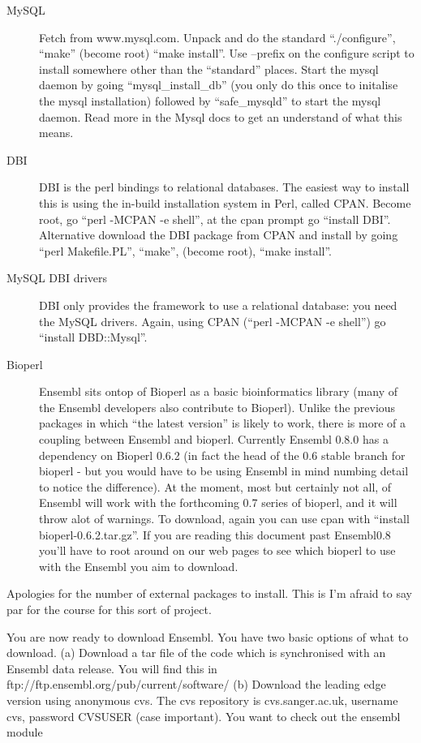 \documentclass[11pt,a4paper]{article}
\begin{document}
\begin{description}
\item[MySQL] Fetch from www.mysql.com. Unpack and do the standard ``./configure'',
``make'' (become root) ``make install''. Use --prefix on the configure script
to install somewhere other than the ``standard'' places. Start the mysql daemon by
going ``mysql\_install\_db'' (you only do this once to initalise the mysql installation) followed
by ``safe\_mysqld'' to start the mysql daemon. Read more in the Mysql docs to get an
understand of what this means.
\item[DBI] DBI is the perl bindings to relational databases. The easiest way to install
this is using the in-build installation system in Perl, called
CPAN. Become root, go ``perl -MCPAN -e shell'', at the cpan prompt go ``install DBI''.
Alternative download the DBI package from CPAN and install by going ``perl Makefile.PL'',
``make'', (become root), ``make install''.
\item[MySQL DBI drivers] DBI only provides the framework to use a relational database:
you need the MySQL drivers. Again, using CPAN (``perl -MCPAN -e shell'') go ``install DBD::Mysql''.
\item[Bioperl] Ensembl sits ontop of Bioperl as a basic bioinformatics library (many of the
Ensembl developers also contribute to Bioperl). Unlike the previous
packages in which ``the latest version'' is likely to work, there is
more of a coupling between Ensembl and bioperl. Currently Ensembl
0.8.0 has a dependency on Bioperl 0.6.2 (in fact the head of the 0.6
stable branch for bioperl - but you would have to be using Ensembl in
mind numbing detail to notice the difference).  At the moment, most
but certainly not all, of Ensembl will work with the forthcoming 0.7
series of bioperl, and it will throw alot of warnings. To download, again you can
use cpan with ``install bioperl-0.6.2.tar.gz''. If you are reading this document past Ensembl0.8
you'll have to root around on our web pages to see which bioperl to use with the Ensembl you aim
to download.
\end{description}

Apologies for the number of external packages to install. This is I'm afraid to say 
par for the course for this sort of project.

You are now ready to download Ensembl. You have two basic options of
what to download.  (a) Download a tar file of the code which is
synchronised with an Ensembl data release.  You will find this in
ftp://ftp.ensembl.org/pub/current/software/ (b) Download the leading
edge version using anonymous cvs. The cvs repository is
cvs.sanger.ac.uk, username cvs, password CVSUSER (case important). You
want to check out the ensembl module
\end{document}
